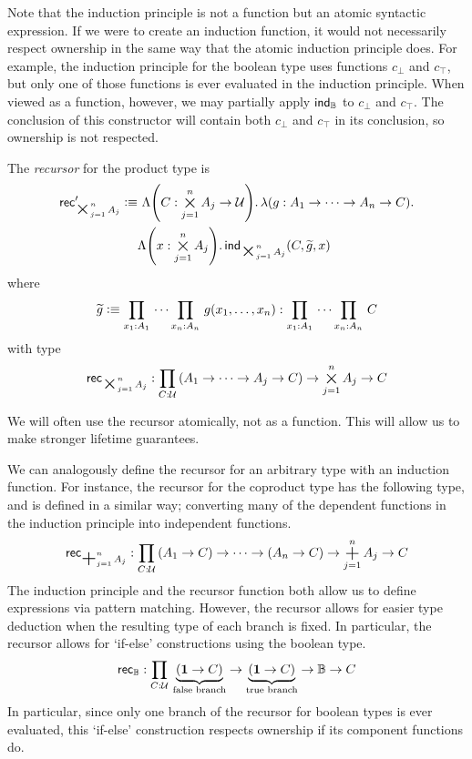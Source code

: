 \documentclass[11pt]{book}
\DeclareMathOperator*{\bigplus}{\scalerel*{+}{\textstyle\sum}}
\DeclareMathOperator*{\bigtimes}{\scalerel*{\times}{\textstyle\sum}}
\begin{document}
Note that the induction principle is not a function but an atomic syntactic expression.
If we were to create an induction function, it would not necessarily respect ownership in the same way that the atomic induction principle does.
For example, the induction principle for the boolean type uses functions \( c_\bot \) and \( c_\top \), but only one of those functions is ever evaluated in the induction principle.
When viewed as a function, however, we may partially apply \( \mathsf{ind}_{\mathbb B} \) to \( c_\bot \) and \( c_\top \).
The conclusion of this constructor will contain both \( c_\bot \) and \( c_\top \) in its conclusion, so ownership is not respected.
\begin{defn}
  The \textit{recursor} for the product type is
  \begin{align*}
    \rec{\bigtimes_{j=1}^n A_j}' \defeq &\ \Lambda\qty(C:\bigtimes_{j=1}^n A_j \to \UU).\,\lambda\qty(g:A_1 \to \dots \to A_n \to C).\\
    &\Lambda\qty(x:\bigtimes_{j=1}^n A_j).\,\ind{\bigtimes_{j=1}^n A_j}(C,\widetilde g,x)
  \end{align*}
  where
  \[
    \widetilde g \defeq \prd{x_1:A_1} \cdots \prd{x_n:A_n} g(x_1, \dots, x_n) : \prd{x_1:A_1} \cdots \prd{x_n:A_n} C
  \]
  with type
  \[
    \rec{\bigtimes_{j=1}^n A_j} : \prd{C:\UU} (A_1 \to \dots \to A_j \to C) \to \bigtimes_{j=1}^n A_j \to C
  \]
\end{defn}
We will often use the recursor atomically, not as a function.
This will allow us to make stronger lifetime guarantees.

We can analogously define the recursor for an arbitrary type with an induction function.
For instance, the recursor for the coproduct type has the following type, and is defined in a similar way; converting many of the dependent functions in the induction principle into independent functions.
\[
  \rec{\bigplus_{j=1}^n A_j} : \prd{C:\UU} (A_1 \to C) \to \cdots \to (A_n \to C) \to \bigplus_{j=1}^n A_j \to C
\]
The induction principle and the recursor function both allow us to define expressions via pattern matching.
However, the recursor allows for easier type deduction when the resulting type of each branch is fixed.
In particular, the recursor allows for `if-else' constructions using the boolean type.
\[
  \rec{\mathbb B} : \prd{C:\UU} \underbrace{(\unit \to C)}_{\text{false branch}} \to \underbrace{(\unit \to C)}_{\text{true branch}} \to \mathbb B \to C
\]
In particular, since only one branch of the recursor for boolean types is ever evaluated, this `if-else' construction respects ownership if its component functions do.
\end{document}
